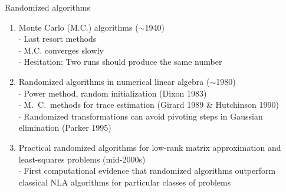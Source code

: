 \documentclass{beamer}
\begin{document}




\begin{frame}{Randomized algorithms}
\begin{enumerate}
    \item Monte Carlo (M.C.) algorithms ($\sim$1940)\\
    $\cdot$ Last resort methods\\
    $\cdot$ M.C. converges slowly\\
    $\cdot$ Hesitation: Two runs should produce the same number
    \pause
    \item Randomized algorithms in numerical linear algebra ($\sim$1980)\\
    $\cdot$ Power method, random initialization (Dixon 1983)\\
    $\cdot$ M.~C.~methods for trace estimation (Girard 1989 \& Hutchinson 1990)\\
    $\cdot$ Randomized transformations can avoid pivoting
steps in Gaussian elimination (Parker 1995)\\
    \pause
    \item  Practical randomized algorithms for low-rank matrix approximation and least-squares problems (mid-2000s)\\
    $\cdot$ First computational evidence that randomized algorithms outperform classical NLA algorithms for particular classes of problems
\end{enumerate}
\end{frame}
\end{document}
